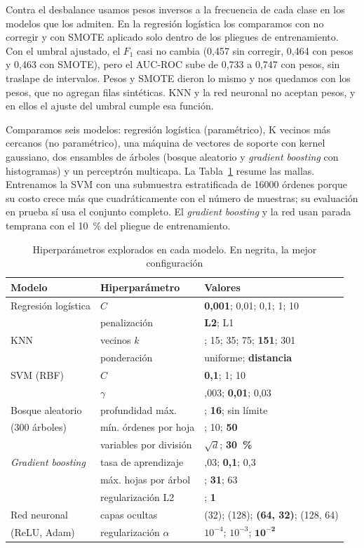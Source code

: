 \documentclass[journal]{IEEEtran}
\begin{document}
Contra el desbalance usamos pesos inversos a la frecuencia de cada clase en los modelos que los admiten. En la regresión logística los comparamos con no corregir y con SMOTE aplicado solo dentro de los pliegues de entrenamiento. Con el umbral ajustado, el $F_1$ casi no cambia (0,457 sin corregir, 0,464 con pesos y 0,463 con SMOTE), pero el AUC-ROC sube de 0,733 a 0,747 con pesos, sin traslape de intervalos. Pesos y SMOTE dieron lo mismo y nos quedamos con los pesos, que no agregan filas sintéticas. KNN y la red neuronal no aceptan pesos, y en ellos el ajuste del umbral cumple esa función.

Comparamos seis modelos: regresión logística (paramétrico), K vecinos más cercanos (no paramétrico), una máquina de vectores de soporte con kernel gaussiano, dos ensambles de árboles (bosque aleatorio y \emph{gradient boosting} con histogramas) y un perceptrón multicapa. La Tabla~\ref{tab:mallas} resume las mallas. Entrenamos la SVM con una submuestra estratificada de \num{16000} órdenes porque su costo crece más que cuadráticamente con el número de muestras; su evaluación en prueba sí usa el conjunto completo. El \emph{gradient boosting} y la red usan parada temprana con el 10~\% del pliegue de entrenamiento.

\begin{table}[!t]
\centering
\caption{Hiperparámetros explorados en cada modelo. En negrita, la mejor configuración}
\label{tab:mallas}
\footnotesize
\begin{tabularx}{\columnwidth}{@{}>{\raggedright\arraybackslash}p{1.9cm}>{\raggedright\arraybackslash}p{2.3cm}>{\raggedright\arraybackslash}X@{}}
\toprule
Modelo & Hiperparámetro & Valores \\
\midrule
Regresión logística & $C$ & \textbf{0,001}; 0,01; 0,1; 1; 10 \\
 & penalización & \textbf{L2}; L1 \\
\addlinespace
KNN & vecinos $k$ & 5; 15; 35; 75; \textbf{151}; 301 \\
 & ponderación & uniforme; \textbf{distancia} \\
\addlinespace
SVM (RBF) & $C$ & \textbf{0,1}; 1; 10 \\
 & $\gamma$ & 0,003; \textbf{0,01}; 0,03 \\
\addlinespace
Bosque aleatorio & profundidad máx. & 8; \textbf{16}; sin límite \\
(300 árboles) & mín. órdenes por hoja & 1; 10; \textbf{50} \\
 & variables por división & $\sqrt{d}$; \textbf{30~\%} \\
\addlinespace
\emph{Gradient boosting} & tasa de aprendizaje & 0,03; \textbf{0,1}; 0,3 \\
 & máx. hojas por árbol & 15; \textbf{31}; 63 \\
 & regularización L2 & 0; \textbf{1} \\
\addlinespace
Red neuronal & capas ocultas & (32); (128); \textbf{(64, 32)}; (128, 64) \\
(ReLU, Adam) & regularización $\alpha$ & $10^{-4}$; $10^{-3}$; $\mathbf{10^{-2}}$ \\
\bottomrule
\end{tabularx}
\end{table}
\end{document}
